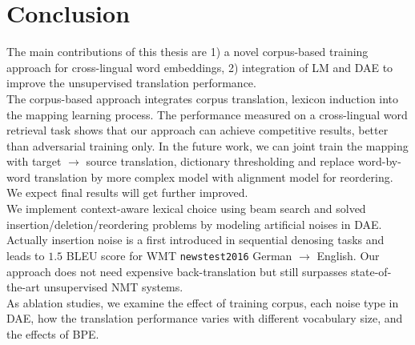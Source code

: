 \chapter{Conclusion}
%
%

The main contributions of this thesis are 1) a novel corpus-based training approach for cross-lingual word embeddings, 2) integration of LM and DAE to improve the unsupervised translation performance. \\
The corpus-based approach integrates corpus translation, lexicon induction into the mapping learning process. The performance measured on a cross-lingual word retrieval task shows that our approach can achieve competitive results, better than adversarial training only. In the future work, we can joint train the mapping with target $\rightarrow$ source translation, dictionary thresholding and replace word-by-word translation by more complex model with alignment model for reordering. We expect final results will get further improved.\\
We implement context-aware lexical choice using beam search and solved insertion/deletion/reordering problems by modeling artificial noises in DAE. Actually insertion noise is a first introduced in sequential denosing tasks and leads to $1.5$ BLEU score for WMT \texttt{newstest2016}  German $\rightarrow$ English.  Our approach does not need expensive back-translation but still surpasses state-of-the-art unsupervised NMT systems.\\
As ablation studies, we examine the effect of training corpus, each noise type in DAE, how the translation performance varies with different vocabulary size, and the effects of BPE.




